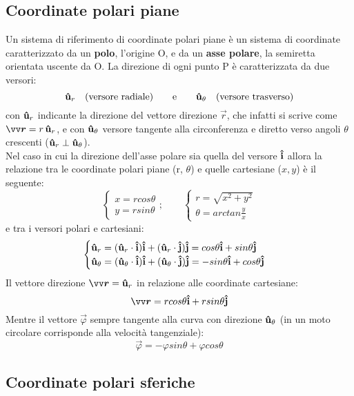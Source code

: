 \subsection*{Coordinate polari piane}
Un sistema di riferimento di coordinate polari piane è un sistema di coordinate 
caratterizzato da un \textbf{polo}, l'origine O, e da un \textbf{asse polare},
la semiretta orientata uscente da O. La direzione di ogni punto P è caratterizzata
da due versori:
\[
 \mathbf{\hat{u}}_r \quad (\text{versore radiale}) \qquad \text{e} \qquad \mathbf{\hat{u}}_{\theta}
 \quad  \text{(versore trasverso)}     
\]
con $\mathbf{\hat{u}}_r$ indicante la direzione del vettore direzione $\vec{r}$, che infatti si 
scrive come $\vec{r} = r \, \v{u}_r$, e con $\mathbf{\hat{u}}_{\theta}$ versore tangente alla 
circonferenza e diretto verso angoli $\theta$ crescenti ($\mathbf{\hat{u}}_r \perp \mathbf{\hat{u}}_{\theta}$).\\
Nel caso in cui la direzione dell'asse polare
sia quella del versore $\mathbf{\hat{i}}$ allora la relazione tra le coordinate polari piane (r, $\theta$)
e quelle cartesiane ($x,y$) è il seguente:
\[
\begin{cases}
     x = r cos \theta \\
     y = r sin \theta
\end{cases}
; \qquad
\begin{cases}
     r = \sqrt{x^2 + y^2} \\
     \theta = arctan \frac{y}{x}
\end{cases}     
\]
e tra i versori polari e cartesiani:
\[
\begin{cases}
     \mathbf{\hat{u}}_r = (\mathbf{\hat{u}}_r \cdot \mathbf{\hat{i}})\mathbf{\hat{i}} + (\mathbf{\hat{u}}_r \cdot \mathbf{\hat{j}})\mathbf{\hat{j}} =
     cos \theta\mathbf{\hat{i}} + sin \theta \mathbf{\hat{j}} \\
     \mathbf{\hat{u}}_{\theta}= (\mathbf{\hat{u}}_{\theta} \cdot \mathbf{\hat{i}})\mathbf{\hat{i}} + (\mathbf{\hat{u}}_{\theta} \cdot \mathbf{\hat{j}})\mathbf{\hat{j}} =
     -sin \theta \mathbf{\hat{i}} + cos \theta \mathbf{\hat{j}}
\end{cases}     
\]
Il vettore direzione $\vec{r} = \v{u}_r$ in relazione alle coordinate cartesiane:
\[
     \vec{r} = r cos \theta \v{i} + r sin \theta \v{j}     
\]
Mentre il vettore $\vec{\varphi}$ sempre tangente alla curva con direzione $\mathbf{\hat{u}}_{\theta}$
(in un moto circolare corrisponde alla velocità tangenziale): 
\[
    \vec{\varphi} = - \varphi sin \theta + \varphi cos \theta     
\]
\subsection*{Coordinate polari sferiche}
